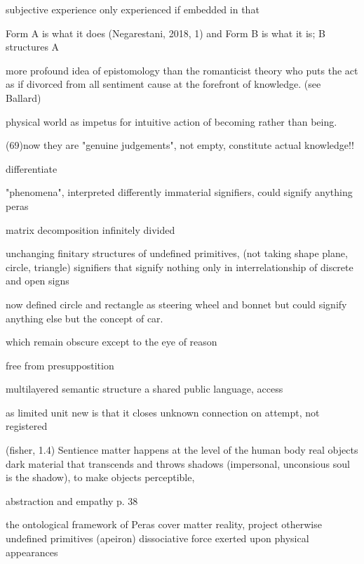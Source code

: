 \documentclass{article}
\begin{document}
subjective experience only experienced if embedded in that


Form A is what it does (Negarestani, 2018, 1) and Form B is what it is; 
B structures A

more profound idea of epistomology
than the romanticist 
theory who puts the act as if divorced from all sentiment cause
at the forefront of knowledge. (see Ballard)

physical world 
as impetus for intuitive action
of becoming rather than being.


(69)now they are "genuine judgements", not empty, constitute actual knowledge!!

differentiate

"phenomena", interpreted differently
immaterial signifiers, 
could signify anything
peras


matrix decomposition
infinitely divided

unchanging finitary structures of undefined primitives, 
(not taking shape plane, circle, triangle)
signifiers that signify nothing 
only in interrelationship of discrete and open signs



now defined circle and rectangle as steering wheel and bonnet
but could signify anything else but the concept of car.

which remain obscure except to the eye of reason

free from presuppostition



multilayered semantic structure
a shared public language,
access  

as limited unit
new is that it 
closes unknown connection on attempt, not registered 











(fisher, 1.4) Sentience matter happens at the level of the human body 
real objects
dark material that transcends and throws shadows (impersonal, unconsious soul is the shadow), 
to make objects perceptible, 

abstraction and empathy 
p. 38





the ontological framework of Peras
cover matter reality, project 
otherwise undefined primitives (apeiron)
dissociative force exerted upon physical appearances 
\end{document}
